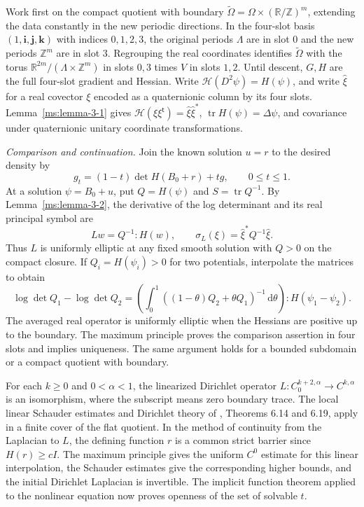 Work first on the compact quotient with boundary $\widetilde\Omega=\Omega\times(\mathbb R/\mathbb Z)^m$, extending the data constantly in the new periodic directions. In the four-slot basis $(1,\mathbf i,\mathbf j,\mathbf k)$ with indices $0,1,2,3$, the original periods $\Lambda$ are in slot $0$ and the new periods $\mathbb Z^m$ are in slot $3$. Regrouping the real coordinates identifies $\widetilde\Omega$ with the torus $\mathbb R^{2m}/(\Lambda\times\mathbb Z^m)$ in slots $0,3$ times $V$ in slots $1,2$. Until descent, $G,H$ are the full four-slot gradient and Hessian. Write $\mathcal H(D^2\psi)=H(\psi)$, and write $\widehat\xi$ for a real covector $\xi$ encoded as a quaternionic column by its four slots. Lemma~\ref{ms:lemma-3-1} gives $\mathcal H(\xi\xi^{\mathsf t})=\widehat\xi\widehat\xi^*$, $\operatorname{tr}H(\psi)=\Delta\psi$, and covariance under quaternionic unitary coordinate transformations.

\emph{Comparison and continuation.} Join the known solution $u=r$ to the desired density by
\[
 g_t=(1-t)\det H(B_0+r)+tg,\qquad 0\le t\le1.
\]
At a solution $\psi=B_0+u$, put $Q=H(\psi)$ and $S=\operatorname{tr}Q^{-1}$. By Lemma~\ref{ms:lemma-3-2}, the derivative of the log determinant and its real principal symbol are
\[
 Lw=Q^{-1}:H(w),\qquad \sigma_L(\xi)=\widehat\xi^*Q^{-1}\widehat\xi .
\]
Thus $L$ is uniformly elliptic at any fixed smooth solution with $Q>0$ on the compact closure. If $Q_i=H(\psi_i)>0$ for two potentials, interpolate the matrices to obtain
\[
 \log\det Q_1-\log\det Q_2=
 \left(\int_0^1((1-\theta)Q_2+\theta Q_1)^{-1}\,\mathrm d\theta\right):H(\psi_1-\psi_2).
\]
The averaged real operator is uniformly elliptic when the Hessians are positive up to the boundary. The maximum principle proves the comparison assertion in four slots and implies uniqueness. The same argument holds for a bounded subdomain or a compact quotient with boundary.

For each $k\ge0$ and $0<\alpha<1$, the linearized Dirichlet operator $L:C_0^{k+2,\alpha}\to C^{k,\alpha}$ is an isomorphism, where the subscript means zero boundary trace. The local linear Schauder estimates and Dirichlet theory of \cite{r-31}, Theorems 6.14 and 6.19, apply in a finite cover of the flat quotient. In the method of continuity from the Laplacian to $L$, the defining function $r$ is a common strict barrier since $H(r)\ge cI$. The maximum principle gives the uniform $C^0$ estimate for this linear interpolation, the Schauder estimates give the corresponding higher bounds, and the initial Dirichlet Laplacian is invertible. The implicit function theorem applied to the nonlinear equation now proves openness of the set of solvable $t$.

